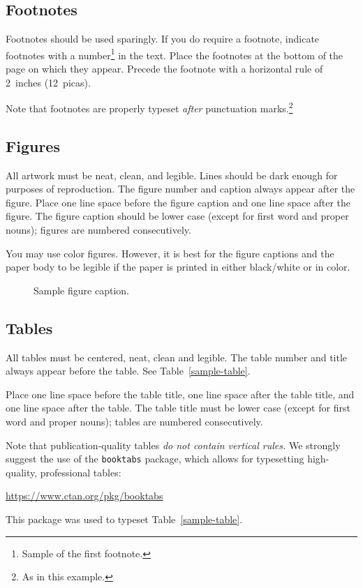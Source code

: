\documentclass{article}
\begin{document}
\subsection{Footnotes}

Footnotes should be used sparingly.  If you do require a footnote,
indicate footnotes with a number\footnote{Sample of the first
  footnote.} in the text. Place the footnotes at the bottom of the
page on which they appear.  Precede the footnote with a horizontal
rule of 2~inches (12~picas).

Note that footnotes are properly typeset \emph{after} punctuation
marks.\footnote{As in this example.}

\subsection{Figures}

All artwork must be neat, clean, and legible. Lines should be dark
enough for purposes of reproduction. The figure number and caption
always appear after the figure. Place one line space before the figure
caption and one line space after the figure. The figure caption should
be lower case (except for first word and proper nouns); figures are
numbered consecutively.

You may use color figures.  However, it is best for the figure
captions and the paper body to be legible if the paper is printed in
either black/white or in color.
\begin{figure}[h]
  \centering
  \fbox{\rule[-.5cm]{0cm}{4cm} \rule[-.5cm]{4cm}{0cm}}
  \caption{Sample figure caption.}
\end{figure}

\subsection{Tables}

All tables must be centered, neat, clean and legible.  The table
number and title always appear before the table.  See
Table~\ref{sample-table}.

Place one line space before the table title, one line space after the
table title, and one line space after the table. The table title must
be lower case (except for first word and proper nouns); tables are
numbered consecutively.

Note that publication-quality tables \emph{do not contain vertical
  rules.} We strongly suggest the use of the \verb+booktabs+ package,
which allows for typesetting high-quality, professional tables:
\begin{center}
  \url{https://www.ctan.org/pkg/booktabs}
\end{center}
This package was used to typeset Table~\ref{sample-table}.
\end{document}
